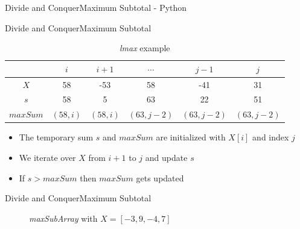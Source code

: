 {%

\begin{frame}{Divide and Conquer}{Maximum Subtotal - Python}
  \vspace{-0.5em}
  
\end{frame}
}



\begin{frame}{Divide and Conquer}{Maximum Subtotal}
  \begin{table}
    \caption{\textit{lmax} example}
    \label{fig:divide_and_conquer:lmax_example}
    \begin{tabular}{c|ccccc}
      {} & $i$ & $i+1$ & $\cdots$ & $j-1$ & $j$\\
      \midrule
      $X$ & 58 & -53 & 58 & -41 & 31\\
      \midrule
       {\color{Mittel-Blau}$s$} & 58 & 5 & 63 & 22 & 51\\
      {\color{Mittel-Blau}$maxSum$} &
      $(58, i)$ & $(58, i)$ & $(63, j-2)$ & $(63, j-2)$ & $(63, j-2)$
    \end{tabular}
  \end{table}
  \begin{itemize}
    \item
      The temporary sum {\color{Mittel-Blau}$s$} and
      {\color{Mittel-Blau}$maxSum$} are initialized with $X[i]$ and index $j$
    \item
      We {\color{Mittel-Blau}iterate over $X$ from $i+1$ to $j$} and
      {\color{Mittel-Blau}update $s$}
    \item
      If {\color{Mittel-Blau}$s > maxSum$} then {\color{Mittel-Blau}$maxSum$}
      gets updated
  \end{itemize}
\end{frame}


\begin{frame}{Divide and Conquer}{Maximum Subtotal}
  \begin{figure}
    \begin{adjustbox}{width=\linewidth}
      
    \end{adjustbox}
    \caption{\textit{maxSubArray} with $X = [-3, 9, -4, 7]$}
    \label{fig:divide_and_conquer:max_sub_array_example}
  \end{figure}
\end{frame}

